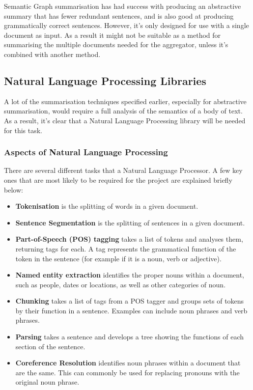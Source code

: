 \documentclass[12pt]{article}
\begin{document}
Semantic Graph summarisation has had success with producing an abstractive summary that has fewer redundant sentences, and is also good at producing grammatically correct sentences. However, it's only designed for use with a single document as input. As a result it might not be suitable as a method for summarising the multiple documents needed for the aggregator, unless it's combined with another method.

\subsection{Natural Language Processing Libraries} 

A lot of the summarisation techniques specified earlier, especially for abstractive summarisation, would require a full analysis of the semantics of a body of text. As a result, it's clear that a Natural Language Processing library will be needed for this task.

\subsubsection{Aspects of Natural Language Processing} 

\label{nlptypes}

There are several different tasks that a Natural Language Processor. A few key ones that are most likely to be required for the project are explained briefly below: \\

\begin{itemize}
	\item \textbf{Tokenisation} is the splitting of words in a given document. \\
	\item \textbf{Sentence Segmentation} is the splitting of sentences in a given document. \\
	\item \textbf{Part-of-Speech (POS) tagging} takes a list of tokens and analyses them, returning tags for each. A tag represents the grammatical function of the token in the sentence (for example if it is a noun, verb or adjective). \\
	\item \textbf{Named entity extraction} identifies the proper nouns within a document, such as people, dates or locations, as well as other categories of noun. \\
	\item \textbf{Chunking} takes a list of tags from a POS tagger and groups sets of tokens by their function in a sentence. Examples can include noun phrases and verb phrases. \\
	\item \textbf{Parsing} takes a sentence and develops a tree showing the functions of each section of the sentence. \\
	\item \textbf{Coreference Resolution} identifies noun phrases within a document that are the same. This can commonly be used for replacing pronouns with the original noun phrase. 
\end{itemize}
\end{document}
